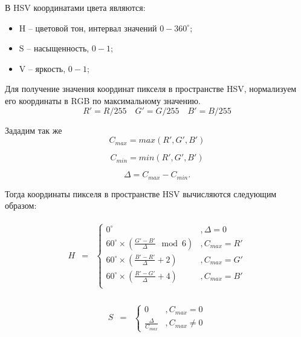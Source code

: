 В HSV координатами цвета являются:

\begin{itemize}
	\item H -- цветовой тон, интервал значений $0 - 360^\circ$;
	\item S -- насыщенность, $0 - 1$;
	\item V -- яркость, $0 - 1$;
\end{itemize}

Для получение значения координат пикселя в пространстве HSV, нормализуем его координаты в RGB по максимальному значению.
\begin{equation}
R'=R/255 \quad G'=G/255 \quad B'=B/255
\end{equation}

Зададим так же 
\begin{equation}
C_{max} = max(R', G', B')
\end{equation}

\begin{equation}
C_{min} = min(R', G', B')
\end{equation}

\begin{equation}
\Delta = C_{max} - C_{min}.
\end{equation}

Тогда координаты пикселя в пространстве HSV вычисляются следующим образом:

\begin{eqnarray}
\begin{matrix}
H & =
& \left\{
\begin{matrix}
0^\circ &, \Delta = 0 \\
60^\circ \times ( \frac{G' - B'}{\Delta} \mod 6 )& , C_{max} = R' \\
60^\circ \times ( \frac{B' - R'}{\Delta} + 2)& , C_{max} = G' \\
60^\circ \times ( \frac{R' - G'}{\Delta} + 4)& , C_{max} = B' \\
\end{matrix} \right.
\end{matrix}
\end{eqnarray}

\begin{eqnarray}
\begin{matrix}
S & =
& \left\{
\begin{matrix}
0 &, C_{max} = 0 \\
\frac{\Delta}{C_{max}} &,C_{max} \ne 0
\end{matrix} \right.
\end{matrix}
\end{eqnarray}


